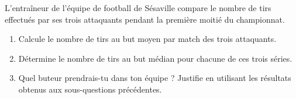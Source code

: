 \documentclass[main.tex]{subfiles}
\begin{document}
\newpage
\begin{exercise}[points=4]
    L'entraîneur de l'équipe de football de Sésaville compare le nombre de tirs effectués par ses
    trois attaquants pendant la première moitié du championnat.
    \begin{center}
        \pgfplotsset{width=.5\linewidth}
        
        
        
    \end{center}

    \begin{enumerate}
        \item Calcule le nombre de tirs au but moyen par match des trois attaquants.
        \item  Détermine le nombre de tirs au but médian pour chacune de ces trois séries.
        \item Quel buteur prendrais-tu dans ton équipe ? Justifie en utilisant les résultats obtenus aux sous-questions précédentes.
    \end{enumerate}
\end{exercise}
\begin{solution}

\end{solution}
\end{document}
